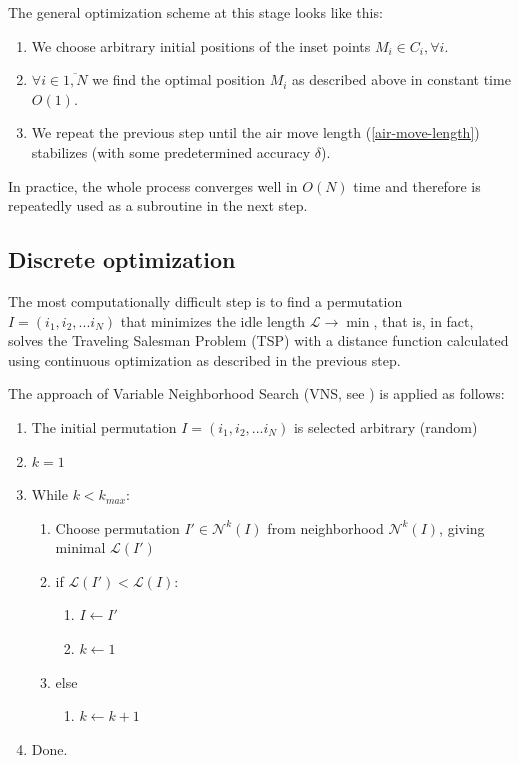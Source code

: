 \documentclass[]{llncs}
\begin{document}
The general optimization scheme at this stage looks like this:
\begin{enumerate}
  \item
  We choose arbitrary initial positions of the inset points
  $M_i \in C_i, \forall i$.
  \item
  $\forall i \in \overline{1,N}$
  we find the optimal position
  $M_i$ as described above in constant time $O(1)$.
  \item
  We repeat the previous step
  until the air move length
  (\ref{air-move-length})
  stabilizes (with some predetermined accuracy $\delta$).
\end{enumerate}

In practice,
the whole process converges well in
$O(N)$
time and therefore is repeatedly used
as a subroutine in the next step.

\subsection{Discrete optimization}

The most computationally difficult step
is to find a permutation
$I = (i_1, i_2, ... i_N)$
that minimizes the idle length
$\mathcal{L} \to \min$,
that is, in fact,
solves the Traveling Salesman Problem (TSP)
with a distance function
calculated using continuous optimization
as described in the previous step.

The approach of
Variable Neighborhood Search
(VNS, see \cite{bi14}) is applied
as follows:

\begin{enumerate}[label*=\arabic*.]
  \item The initial permutation
  $I = (i_1, i_2, ... i_N)$
  is selected arbitrary
  (random)
  \item $k=1$
  \item While $k < k_{max}$:
  \begin{enumerate}[label*=\arabic*.]
    \item Choose permutation $I' \in \mathcal N^k(I)$
    from neighborhood $\mathcal N^k(I)$,
    giving minimal $\mathcal L(I')$
    \item if $\mathcal L(I')< \mathcal L(I)$:
    \begin{enumerate}[label*=\arabic*.]
      \item $I \gets I'$
      \item $k \gets 1$
    \end{enumerate}
    \item else
    \begin{enumerate}[label*=\arabic*.]
      \item $k \gets k+1$
    \end{enumerate}
  \end{enumerate}
  \item Done.
\end{enumerate}
\end{document}
